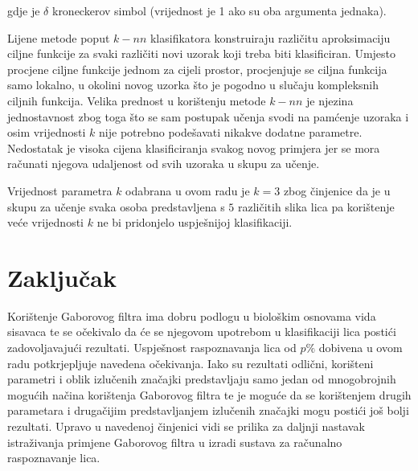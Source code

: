 \documentclass{ru}
\begin{document}
gdje je $\delta$ kroneckerov simbol (vrijednost je 1 ako su oba argumenta jednaka).


Lijene metode poput $k-nn$ klasifikatora konstruiraju različitu aproksimaciju
ciljne funkcije za svaki različiti novi uzorak koji treba biti klasificiran. Umjesto
procjene ciljne funkcije jednom za cijeli prostor, procjenjuje se ciljna funkcija
samo lokalno, u okolini novog uzorka što je pogodno u slučaju kompleksnih ciljnih
funkcija. Velika prednost u korištenju metode $k-nn$ je njezina jednostavnost
zbog toga što se sam postupak učenja svodi na pamćenje uzoraka i osim vrijednosti
$k$ nije potrebno podešavati nikakve dodatne parametre. Nedostatak je visoka
cijena klasificiranja svakog novog primjera jer se mora računati njegova
udaljenost od svih uzoraka u skupu za učenje.

Vrijednost parametra $k$ odabrana u ovom radu je $k = 3$ zbog činjenice da je u
skupu za učenje svaka osoba predstavljena s $5$ različitih slika lica pa
korištenje veće vrijednosti $k$ ne bi pridonjelo uspješnijoj klasifikaciji.


\chapter{Zaključak}

Korištenje Gaborovog filtra ima dobru podlogu u biološkim osnovama vida
sisavaca te se očekivalo da će se njegovom upotrebom u klasifikaciji lica
postići zadovoljavajući rezultati. Uspješnost raspoznavanja lica od $p\%$
dobivena u ovom radu potkrjepljuje navedena očekivanja. Iako su rezultati
odlični, korišteni parametri i oblik izlučenih značajki predstavljaju
samo jedan od mnogobrojnih mogućih načina korištenja Gaborovog filtra te je
moguće da se korištenjem drugih parametara i drugačijim predstavljanjem
izlučenih značajki mogu postići još bolji rezultati. Upravo u navedenoj
činjenici vidi se prilika za daljnji nastavak istraživanja primjene Gaborovog
filtra u izradi sustava za računalno raspoznavanje lica.




\end{document}
